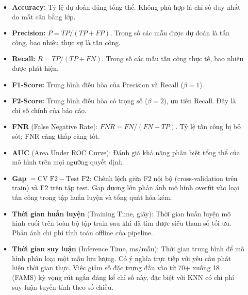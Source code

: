 \begin{itemize}
    \item \textbf{Accuracy:} Tỷ lệ dự đoán đúng tổng thể. Không phù hợp là chỉ số duy nhất do mất cân bằng lớp.
    \item \textbf{Precision:} $P = TP / (TP + FP)$. Trong số các mẫu được dự đoán là tấn công, bao nhiêu thực sự là tấn công.
    \item \textbf{Recall:} $R = TP / (TP + FN)$. Trong số các mẫu tấn công thực tế, bao nhiêu được phát hiện.
    \item \textbf{F1-Score:} Trung bình điều hòa của Precision và Recall ($\beta = 1$).
    \item \textbf{F2-Score:} Trung bình điều hòa có trọng số ($\beta = 2$), ưu tiên Recall. Đây là chỉ số chính của báo cáo.
    \item \textbf{FNR} (False Negative Rate): $FNR = FN / (FN + TP)$. Tỷ lệ tấn công bị bỏ sót; FNR càng thấp càng tốt.
    \item \textbf{AUC} (Area Under ROC Curve): Đánh giá khả năng phân biệt tổng thể của mô hình trên mọi ngưỡng quyết định.
    \item \textbf{Gap} $= \text{CV F2} - \text{Test F2}$: Chênh lệch giữa F2 nội bộ (cross-validation trên train) và F2 trên tập test. Gap dương lớn phản ánh mô hình overfit vào loại tấn công trong tập huấn luyện và tổng quát hóa kém.
    \item \textbf{Thời gian huấn luyện} (Training Time, giây): Thời gian huấn luyện mô hình cuối trên toàn bộ tập train sau khi đã tìm được siêu tham số tối ưu. Phản ánh chi phí tính toán offline của pipeline.
    \item \textbf{Thời gian suy luận} (Inference Time, ms/mẫu): Thời gian trung bình để mô hình phân loại một mẫu lưu lượng. Có ý nghĩa trực tiếp với yêu cầu phát hiện thời gian thực. Việc giảm số đặc trưng đầu vào từ 70+ xuống 18 (FAMS) kỳ vọng rút ngắn đáng kể chỉ số này, đặc biệt với KNN có chi phí suy luận tuyến tính theo số chiều.
\end{itemize}
